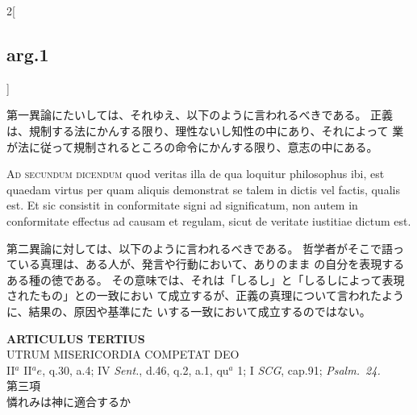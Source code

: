 \documentclass[paper=a4paper,fontsize=10pt,jafontsize=9pt,titlepage]{jlreq}
\begin{document}
\begin{paracol}{2}[\subsection{arg.1}]
\switchcolumn

第一異論にたいしては、それゆえ、以下のように言われるべきである。
正義は、規制する法にかんする限り、理性ないし知性の中にあり、それによって
 業が法に従って規制されるところの命令にかんする限り、意志の中にある。

\switchcolumn*[\subsection{ad.2}]

{\scshape Ad secundum dicendum} quod veritas illa de qua
loquitur philosophus ibi, est quaedam virtus per quam aliquis demonstrat
se talem in dictis vel factis, qualis est. Et sic consistit in
conformitate signi ad significatum, non autem in conformitate effectus
ad causam et regulam, sicut de veritate iustitiae dictum est.

\switchcolumn

第二異論に対しては、以下のように言われるべきである。
哲学者がそこで語っている真理は、ある人が、発言や行動において、ありのまま
 の自分を表現するある種の徳である。
その意味では、それは「しるし」と「しるしによって表現されたもの」との一致におい
 て成立するが、正義の真理について言われたように、結果の、原因や基準にた
 いする一致において成立するのではない。

\end{paracol}
\newpage
{}
{}
\setcounter{section}{3}
\setcounter{subsection}{0}




\begin{center}
 {\Large {\bfseries ARTICULUS TERTIUS}}\\
 {\large UTRUM MISERICORDIA COMPETAT DEO}\\
 {\footnotesize II$^a$ II$^ae$, q.30, a.4; IV {\itshape Sent.}, d.46,
 q.2, a.1, qu$^a$ 1; I {\itshape SCG}, cap.91; {\itshape Psalm.~24.}}\\
 {\Large 第三項\\憐れみは神に適合するか}
\end{center}
\end{document}
